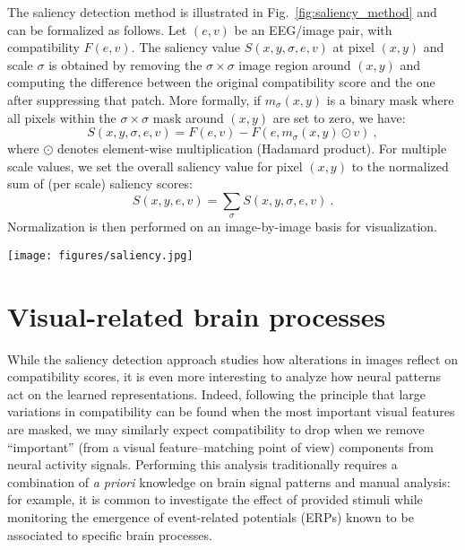 \documentclass[10pt,journal,compsoc,twocolumn]{IEEEtran}
\begin{document}
The saliency detection method is illustrated in Fig.~\ref{fig:saliency_method} and can be formalized as follows. Let $(e,v)$ be an EEG/image pair, with compatibility $F(e,v)$. The saliency value $S(x,y, \sigma,e,v)$ at pixel  $(x,y)$ and scale $\sigma$ is obtained by removing the $\sigma \times \sigma$ image region around $(x,y)$ and computing the difference between the original compatibility score and the one after suppressing that patch. More formally, if $m_\sigma(x,y)$ is a binary mask where all pixels within the $\sigma \times \sigma$ mask around $(x,y)$ are set to zero, we have:
\begin{equation}
 S(x,y,\sigma,e,v) = F(e,v) - F(e, m_\sigma(x,y) \odot v)~,
\end{equation}
where $\odot$ denotes element-wise multiplication (Hadamard product). For multiple scale values, we set the overall saliency value for pixel $(x, y)$ to the normalized sum of (per scale) saliency scores:
\begin{equation}
 S(x,y,e,v) = \sum_\sigma S(x,y,\sigma,e,v)~.
\end{equation}
Normalization is then performed on an image-by-image basis for visualization. 

\begin{figure*}
	\centering
	\texttt{[image: figures/saliency.jpg]}
	\caption{\textbf{Our multiscale suppression-based saliency detection}. Given an EEG/image pair, we estimate the saliency of an image patch by masking it and computing the corresponding variation in compatibility. Performing the analysis at multiple scales and for all image pixels results in a saliency map of the whole image.
	Note that, although the example scale-specific saliency maps appear pixellated, that is only a graphical artifact to give the effect of scale: in practice, scale-specific maps are still computed pixel by pixel.}
	\label{fig:saliency_method}
\end{figure*}

\section{Visual-related brain processes}\label{sec:eeg_analysis}

While the saliency detection approach studies how alterations in images reflect on compatibility scores, it is even more interesting to analyze how neural patterns act on the learned representations. Indeed, following the principle that large variations in compatibility can be found when the most important visual features are masked, we may similarly expect compatibility to drop when we remove ``important'' (from a visual feature--matching point of view) components from neural activity signals. Performing this analysis traditionally requires a combination of \emph{a priori} knowledge on brain signal patterns and manual analysis: for example, it is common to investigate the effect of provided stimuli while monitoring the emergence of event-related potentials (ERPs) known to be associated to specific brain processes. 
\end{document}

